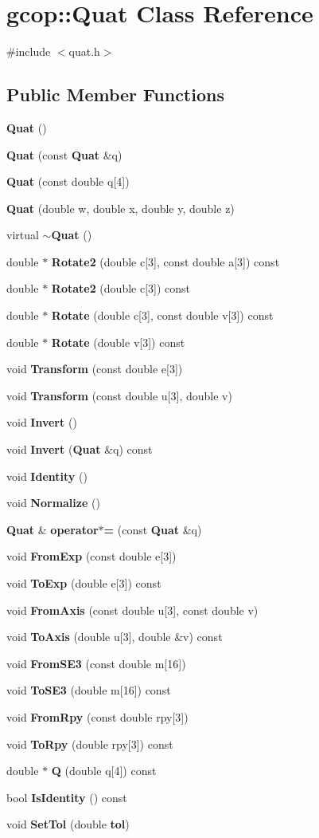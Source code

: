 \section{gcop\-:\-:\-Quat \-Class \-Reference}
\label{classgcop_1_1Quat}


{\ttfamily \#include $<$quat.\-h$>$}

\subsection*{\-Public \-Member \-Functions}
\begin{DoxyCompactItemize}
\item 
{\bf \-Quat} ()
\item 
{\bf \-Quat} (const {\bf \-Quat} \&q)
\item 
{\bf \-Quat} (const double q[4])
\item 
{\bf \-Quat} (double w, double x, double y, double z)
\item 
virtual {\bf $\sim$\-Quat} ()
\item 
double $\ast$ {\bf \-Rotate2} (double c[3], const double a[3]) const 
\item 
double $\ast$ {\bf \-Rotate2} (double c[3]) const 
\item 
double $\ast$ {\bf \-Rotate} (double c[3], const double v[3]) const 
\item 
double $\ast$ {\bf \-Rotate} (double v[3]) const 
\item 
void {\bf \-Transform} (const double e[3])
\item 
void {\bf \-Transform} (const double u[3], double v)
\item 
void {\bf \-Invert} ()
\item 
void {\bf \-Invert} ({\bf \-Quat} \&q) const 
\item 
void {\bf \-Identity} ()
\item 
void {\bf \-Normalize} ()
\item 
{\bf \-Quat} \& {\bf operator$\ast$=} (const {\bf \-Quat} \&q)
\item 
void {\bf \-From\-Exp} (const double e[3])
\item 
void {\bf \-To\-Exp} (double e[3]) const 
\item 
void {\bf \-From\-Axis} (const double u[3], const double v)
\item 
void {\bf \-To\-Axis} (double u[3], double \&v) const 
\item 
void {\bf \-From\-S\-E3} (const double m[16])
\item 
void {\bf \-To\-S\-E3} (double m[16]) const 
\item 
void {\bf \-From\-Rpy} (const double rpy[3])
\item 
void {\bf \-To\-Rpy} (double rpy[3]) const 
\item 
double $\ast$ {\bf \-Q} (double q[4]) const 
\item 
bool {\bf \-Is\-Identity} () const 
\item 
void {\bf \-Set\-Tol} (double {\bf tol})
\end{DoxyCompactItemize}
